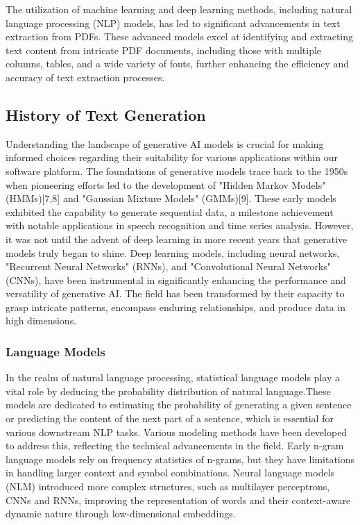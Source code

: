 \documentclass[conference]{IEEEtran}
\begin{document}
The utilization of machine learning and deep learning methods, including natural language processing (NLP) models, has led to significant advancements in text extraction from PDFs. These advanced models excel at identifying and extracting text content from intricate PDF documents, including those with multiple columns, tables, and a wide variety of fonts, further enhancing the efficiency and accuracy of text extraction processes.

\subsection{History of Text Generation}

Understanding the landscape of generative AI models is crucial for making informed choices regarding their suitability for various applications within our software platform. The foundations of generative models trace back to the 1950s when pioneering efforts led to the development of "Hidden Markov Models" (HMMs)[7,8] and "Gaussian Mixture Models" (GMMs)[9]. These early models exhibited the capability to generate sequential data, a milestone achievement with notable applications in speech recognition and time series analysis. However, it was not until the advent of deep learning in more recent years that generative models truly began to shine. Deep learning models, including neural networks, "Recurrent Neural Networks" (RNNs), and "Convolutional Neural Networks" (CNNs), have been instrumental in significantly enhancing the performance and versatility of generative AI. The field has been transformed by their capacity to grasp intricate patterns, encompass enduring relationships, and produce data in high dimensions.

\subsubsection{Language Models}

In the realm of natural language processing, statistical language models play a vital role by deducing the probability distribution of natural language.These models are dedicated to estimating the probability of generating a given sentence or predicting the content of the next part of a sentence, which is essential for various downstream NLP tasks. Various modeling methods have been developed to address this, reflecting the technical advancements in the field. Early n-gram language models rely on frequency statistics of n-grams, but they have limitations in handling larger context and symbol combinations. Neural language models (NLM) introduced more complex structures, such as multilayer perceptrons, CNNs and RNNs, improving the representation of words and their context-aware dynamic nature through low-dimensional embeddings.
\end{document}
